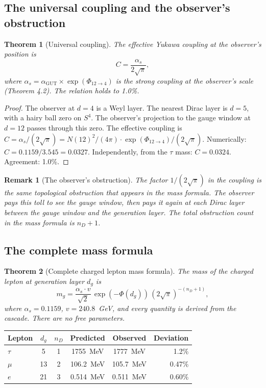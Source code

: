\documentclass[12pt,a4paper]{article}
\newtheorem{theorem}{Theorem}[section]
\newtheorem*{remark}{Remark}
\begin{document}
\subsection{The universal coupling and the observer's obstruction}

\begin{theorem}[Universal coupling]
The effective Yukawa coupling at the observer's position is
\[
C = \frac{\alpha_s}{2\sqrt{\pi}},
\]
where $\alpha_s = \alpha_{\text{GUT}} \times \exp(\Phi_{12 \to 4})$ is the strong coupling at the observer's scale (Theorem 4.2). The relation holds to 1.0\%.
\end{theorem}

\begin{proof}
The observer at $d = 4$ is a Weyl layer. The nearest Dirac layer is $d = 5$, with a hairy ball zero on $S^4$. The observer's projection to the gauge window at $d = 12$ passes through this zero. The effective coupling is $C = \alpha_s/(2\sqrt{\pi}) = N(12)^2/(4\pi) \cdot \exp(\Phi_{12 \to 4})/(2\sqrt{\pi})$. Numerically: $C = 0.1159/3.545 = 0.0327$. Independently, from the $\tau$ mass: $C = 0.0324$. Agreement: 1.0\%.
\end{proof}

\begin{remark}[The observer's obstruction]
The factor $1/(2\sqrt{\pi})$ in the coupling is the same topological obstruction that appears in the mass formula. The observer pays this toll to see the gauge window, then pays it again at each Dirac layer between the gauge window and the generation layer. The total obstruction count in the mass formula is $n_D + 1$.
\end{remark}

\subsection{The complete mass formula}

\begin{theorem}[Complete charged lepton mass formula]
The mass of the charged lepton at generation layer $d_g$ is
\[
m_g = \frac{\alpha_s \cdot v}{\sqrt{2}}\,\exp(-\Phi(d_g))\,(2\sqrt{\pi})^{-(n_D+1)},
\]
where $\alpha_s = 0.1159$, $v = 240.8$~GeV, and every quantity is derived from the cascade. There are no free parameters.
\end{theorem}

\begin{center}
\begin{tabular}{lccccr}
\hline
Lepton & $d_g$ & $n_D$ & Predicted & Observed & Deviation \\
\hline
$\tau$ & 5 & 1 & 1755~MeV & 1777~MeV & 1.2\% \\
$\mu$ & 13 & 2 & 106.2~MeV & 105.7~MeV & 0.47\% \\
$e$ & 21 & 3 & 0.514~MeV & 0.511~MeV & 0.60\% \\
\hline
\end{tabular}
\end{center}
\end{document}
